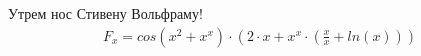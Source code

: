 \documentclass{article}
\begin{document}
\par Утрем нос Стивену Вольфраму!
\begin{gather*}
F_{x} = cos\left(x ^ {2} + x ^ {x}\right) \cdot \left(2 \cdot x + x ^ {x} \cdot \left( \frac {x} {x} + ln\left(x\right)\right)\right)\\
\end{gather*}
\end{document}
